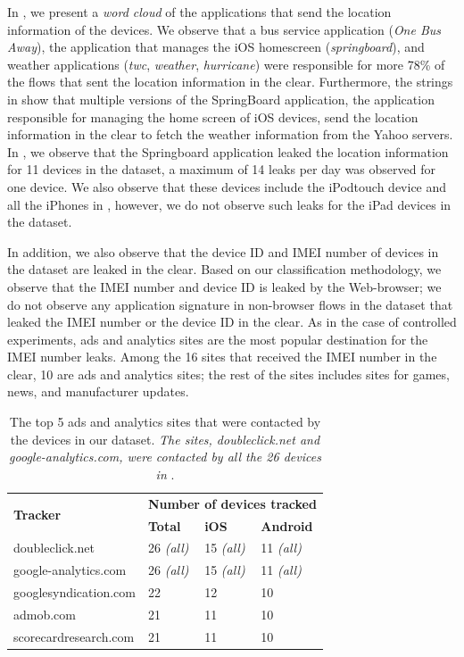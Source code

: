 In , we present a \emph{word cloud} of
the applications that send the location information of the devices.
We observe that a bus service application (\emph{One Bus Away}), the
application that manages the iOS homescreen (\emph{springboard}), and
weather applications (\emph{twc}, \emph{weather}, \emph{hurricane})
were responsible for more 78\% of the flows that sent the location
information in the clear. 
Furthermore, the \useragent strings in  show that multiple versions of the SpringBoard application, the application responsible for managing the home screen of iOS devices, send the location information in the clear to fetch the weather information from the Yahoo servers. 
In , we observe that the Springboard application leaked the location information for 11 devices in the \mobWild dataset, a maximum of 14 leaks per day was observed for one device. 
We also observe that these devices include the iPodtouch device and all the iPhones in \mobWild, however, we do not observe such leaks for the iPad devices in the \mobWild dataset.  


In addition, we also observe that the device ID and IMEI number of
devices in the \mobWild dataset are leaked in the clear.  Based on our
classification methodology, we observe that the IMEI number and device
ID is leaked by the Web-browser; we do not observe any application
signature in non-browser flows in the \mobWild dataset that leaked the
IMEI number or the device ID in the clear.  As in the case of
controlled experiments, ads and analytics sites are the most popular
destination for the IMEI number leaks.  Among the 16 sites that received 
the IMEI number in the clear, 10 are ads and analytics sites;
the rest of the sites includes sites for games, news, and manufacturer
updates.

\begin{table}
\centering
\begin{small}
\begin{tabular}{|p{}|p{}|p{}|p{}|}
\hline
\multirow{2}{*}{\bf Tracker} & \multicolumn{3}{c|}{\bf Number of devices tracked}\tabularnewline
\cline{2-4}
                      &  {\bf Total} & {\bf iOS} & {\bf Android} \tabularnewline
\hline
doubleclick.net       & 26 {\em(all)} & 15 {\em(all)} & 11 {\em(all)} \tabularnewline
\hline
google-analytics.com  & 26 {\em(all)} & 15 {\em(all)}  & 11 {\em(all)} \tabularnewline
\hline
googlesyndication.com & 22 & 12 & 10 \tabularnewline
\hline
admob.com             & 21 & 11 & 10 \tabularnewline
\hline
scorecardresearch.com &  21 & 11 & 10 \tabularnewline
\hline
\end{tabular}
\end{small}
\caption{The top 5 ads and analytics sites that were contacted by the devices in our dataset.
\emph{The sites, doubleclick.net and google-analytics.com, were contacted by all the 26 devices in} \mobWild.}
\label{tab:top-trackers}
\end{table}

